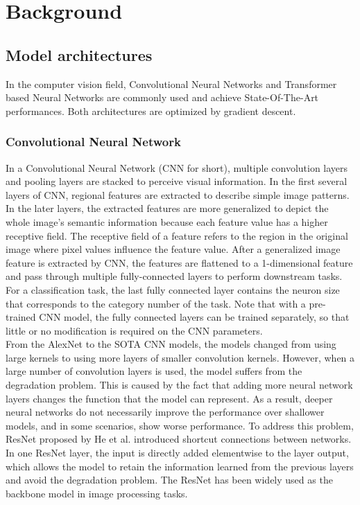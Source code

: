\documentclass[12pt,twoside]{report}
\begin{document}
\chapter{Background}

\section{Model architectures}
In the computer vision field, Convolutional Neural Networks and Transformer based Neural Networks are commonly used and achieve State-Of-The-Art performances. Both architectures are optimized by gradient descent.

\subsection{Convolutional Neural Network}
In a Convolutional Neural Network (CNN for short), multiple convolution layers and pooling layers are stacked to perceive visual information. In the first several layers of CNN, regional features are extracted to describe simple image patterns. In the later layers, the extracted features are more generalized to depict the whole image's semantic information because each feature value has a higher receptive field. The receptive field of a feature refers to the region in the original image where pixel values influence the feature value. After a generalized image feature is extracted by CNN, the features are flattened to a 1-dimensional feature and pass through multiple fully-connected layers to perform downstream tasks. For a classification task, the last fully connected layer contains the neuron size that corresponds to the category number of the task. Note that with a pre-trained CNN model, the fully connected layers can be trained separately, so that little or no modification is required on the CNN parameters. \\

From the AlexNet\cite{alexnet} to the SOTA CNN models, the models changed from using large kernels to using more layers of smaller convolution kernels. However, when a large number of convolution layers is used, the model suffers from the degradation problem. This is caused by the fact that adding more neural network layers changes the function that the model can represent. As a result, deeper neural networks do not necessarily improve the performance over shallower models, and in some scenarios, show worse performance. To address this problem, ResNet\cite{resnet} proposed by He et al. introduced shortcut connections between networks. In one ResNet layer, the input is directly added elementwise to the layer output, which allows the model to retain the information learned from the previous layers and avoid the degradation problem. The ResNet has been widely used as the backbone model in image processing tasks. 
\end{document}
